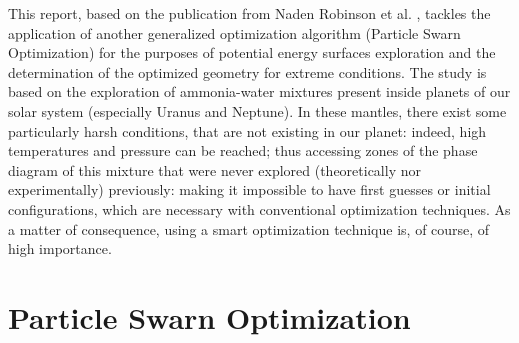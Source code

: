 \documentclass[11pt]{article}
\begin{document}
\begin{multicols}{2}
This report, based on the publication from Naden Robinson et al. \cite{original}, tackles the application of another generalized optimization algorithm (Particle Swarn Optimization) for the purposes of potential energy surfaces exploration and the determination of the optimized geometry for extreme conditions. The study is based on the exploration of ammonia-water mixtures present inside planets of our solar system (especially Uranus and Neptune). In these mantles, there exist some particularly harsh conditions, that are not existing in our planet: indeed, high temperatures and pressure can be reached; thus accessing zones of the phase diagram of this mixture that were never explored (theoretically nor experimentally) previously: making it impossible to have first guesses or initial configurations, which are necessary with conventional optimization techniques. As a matter of consequence, using a smart optimization technique is, of course, of high importance.

\section*{Particle Swarn Optimization}

\end{multicols}
\end{document}
